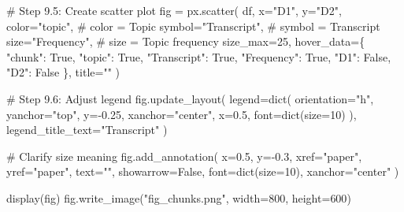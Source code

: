 \documentclass[
  letterpaper,
  DIV=11,
  numbers=noendperiod]{scrartcl}
\newenvironment{Shaded}{\begin{snugshade}}{\end{snugshade}}
\newcommand{\BuiltInTok}[1]{\textcolor[rgb]{0.00,0.23,0.31}{#1}}
\newcommand{\CommentTok}[1]{\textcolor[rgb]{0.37,0.37,0.37}{#1}}
\newcommand{\DecValTok}[1]{\textcolor[rgb]{0.68,0.00,0.00}{#1}}
\newcommand{\FloatTok}[1]{\textcolor[rgb]{0.68,0.00,0.00}{#1}}
\newcommand{\NormalTok}[1]{\textcolor[rgb]{0.00,0.23,0.31}{#1}}
\newcommand{\OperatorTok}[1]{\textcolor[rgb]{0.37,0.37,0.37}{#1}}
\newcommand{\StringTok}[1]{\textcolor[rgb]{0.13,0.47,0.30}{#1}}
\newcommand{\VariableTok}[1]{\textcolor[rgb]{0.07,0.07,0.07}{#1}}
\begin{document}
\begin{Shaded}
\begin{Highlighting}[]
\CommentTok{\# Step 9.5: Create scatter plot}
\NormalTok{fig }\OperatorTok{=}\NormalTok{ px.scatter(}
\NormalTok{    df,}
\NormalTok{    x}\OperatorTok{=}\StringTok{"D1"}\NormalTok{,}
\NormalTok{    y}\OperatorTok{=}\StringTok{"D2"}\NormalTok{,}
\NormalTok{    color}\OperatorTok{=}\StringTok{"topic"}\NormalTok{,        }\CommentTok{\# color = Topic}
\NormalTok{    symbol}\OperatorTok{=}\StringTok{"Transcript"}\NormalTok{,  }\CommentTok{\# symbol = Transcript}
\NormalTok{    size}\OperatorTok{=}\StringTok{"Frequency"}\NormalTok{,     }\CommentTok{\# size = Topic frequency}
\NormalTok{    size\_max}\OperatorTok{=}\DecValTok{25}\NormalTok{,}
\NormalTok{    hover\_data}\OperatorTok{=}\NormalTok{\{}
        \StringTok{"chunk"}\NormalTok{: }\VariableTok{True}\NormalTok{,}
        \StringTok{"topic"}\NormalTok{: }\VariableTok{True}\NormalTok{,}
        \StringTok{"Transcript"}\NormalTok{: }\VariableTok{True}\NormalTok{,}
        \StringTok{"Frequency"}\NormalTok{: }\VariableTok{True}\NormalTok{,}
        \StringTok{"D1"}\NormalTok{: }\VariableTok{False}\NormalTok{,}
        \StringTok{"D2"}\NormalTok{: }\VariableTok{False}
\NormalTok{    \},}
\NormalTok{    title}\OperatorTok{=}\StringTok{""}
\NormalTok{)}

\CommentTok{\# Step 9.6: Adjust legend}
\NormalTok{fig.update\_layout(}
\NormalTok{    legend}\OperatorTok{=}\BuiltInTok{dict}\NormalTok{(}
\NormalTok{        orientation}\OperatorTok{=}\StringTok{"h"}\NormalTok{,}
\NormalTok{        yanchor}\OperatorTok{=}\StringTok{"top"}\NormalTok{,}
\NormalTok{        y}\OperatorTok{={-}}\FloatTok{0.25}\NormalTok{,}
\NormalTok{        xanchor}\OperatorTok{=}\StringTok{"center"}\NormalTok{,}
\NormalTok{        x}\OperatorTok{=}\FloatTok{0.5}\NormalTok{,}
\NormalTok{        font}\OperatorTok{=}\BuiltInTok{dict}\NormalTok{(size}\OperatorTok{=}\DecValTok{10}\NormalTok{)}
\NormalTok{    ),}
\NormalTok{    legend\_title\_text}\OperatorTok{=}\StringTok{"Transcript"}
\NormalTok{)}

\CommentTok{\# Clarify size meaning}
\NormalTok{fig.add\_annotation(}
\NormalTok{    x}\OperatorTok{=}\FloatTok{0.5}\NormalTok{,}
\NormalTok{    y}\OperatorTok{={-}}\FloatTok{0.3}\NormalTok{,}
\NormalTok{    xref}\OperatorTok{=}\StringTok{"paper"}\NormalTok{,}
\NormalTok{    yref}\OperatorTok{=}\StringTok{"paper"}\NormalTok{,}
\NormalTok{    text}\OperatorTok{=}\StringTok{""}\NormalTok{,}
\NormalTok{    showarrow}\OperatorTok{=}\VariableTok{False}\NormalTok{,}
\NormalTok{    font}\OperatorTok{=}\BuiltInTok{dict}\NormalTok{(size}\OperatorTok{=}\DecValTok{10}\NormalTok{),}
\NormalTok{    xanchor}\OperatorTok{=}\StringTok{"center"}
\NormalTok{)}

\NormalTok{display(fig)}
\NormalTok{fig.write\_image(}\StringTok{"fig\_chunks.png"}\NormalTok{, width}\OperatorTok{=}\DecValTok{800}\NormalTok{, height}\OperatorTok{=}\DecValTok{600}\NormalTok{)}
\end{Highlighting}
\end{Shaded}
\end{document}
